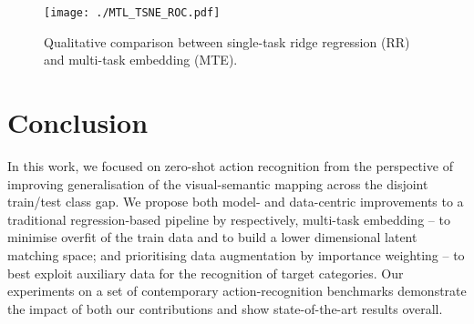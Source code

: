 \documentclass[runningheads]{llncs}
\begin{document}
\begin{figure}[t]
\centering
\texttt{[image: ./MTL\_TSNE\_ROC.pdf]}
\caption{Qualitative comparison between single-task ridge regression (RR) and multi-task embedding (MTE). }\label{fig:MTL_Qualitative}


\end{figure}

\section{Conclusion}


In this work, we focused on zero-shot action recognition from the
perspective of improving generalisation of the 
visual-semantic mapping across the disjoint train/test class gap. We
propose both model- and data-centric improvements to a traditional
regression-based pipeline by respectively, multi-task embedding -- to
minimise overfit of the train data and to build a lower dimensional latent
matching space; and prioritising data augmentation by importance weighting -- to best
exploit auxiliary data for the recognition of target categories. Our
experiments on a set of contemporary action-recognition benchmarks
demonstrate the impact of both our contributions and show state-of-the-art results overall.





\end{document}
